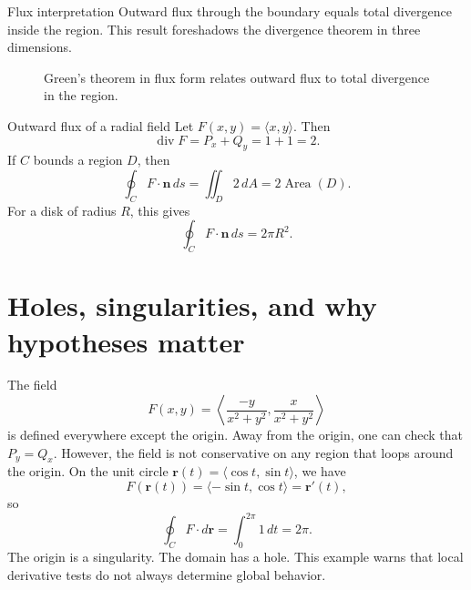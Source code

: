 \documentclass[11pt,oneside]{book}
\newcommand{\vect}[1]{\mathbf{#1}}
\newcommand{\diver}{\operatorname{div}}
\begin{document}
\begin{tipbox}{Flux interpretation}
Outward flux through the boundary equals total divergence inside the region. This result foreshadows the divergence theorem in three dimensions.
\end{tipbox}

\begin{figure}[H]
\centering
{}
\caption{Green's theorem in flux form relates outward flux to total divergence in the region.}
\end{figure}

\begin{examplebox}{Outward flux of a radial field}
Let $F(x,y)=\langle x,y\rangle$. Then
\[
\diver F=P_x+Q_y=1+1=2.
\]
If $C$ bounds a region $D$, then
\[
\oint_C F\cdot \vect n\,ds=\iint_D 2\,dA=2\operatorname{Area}(D).
\]
For a disk of radius $R$, this gives
\[
\oint_C F\cdot \vect n\,ds=2\pi R^2.
\]
\end{examplebox}

\section{Holes, singularities, and why hypotheses matter}

The field
\[
F(x,y)=\left\langle \frac{-y}{x^2+y^2},\frac{x}{x^2+y^2}\right\rangle
\]
is defined everywhere except the origin. Away from the origin, one can check that $P_y=Q_x$. However, the field is not conservative on any region that loops around the origin. On the unit circle $\vect r(t)=\langle \cos t,\sin t\rangle$, we have
\[
F(\vect r(t))=\langle -\sin t,\cos t\rangle=\vect r'(t),
\]
so
\[
\oint_C F\cdot d\vect r=\int_0^{2\pi}1\,dt=2\pi.
\]
The origin is a singularity. The domain has a hole. This example warns that local derivative tests do not always determine global behavior.
\end{document}
